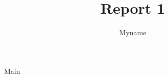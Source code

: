 \documentclass[11pt,a4j]{jarticle}
\title{Report 1}
\author{Myname}
\begin{document}
\maketitle
 {Main}
\end{document}

